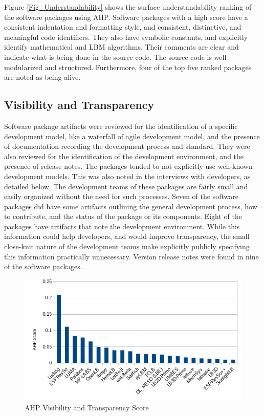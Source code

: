 \documentclass[12pt, notitlepage]{article}
\begin{document}
Figure \ref{Fig_Understandability} shows the surface understandability ranking of the software packages using AHP. Software packages with a high score have a consistent indentation and formatting style, and consistent, distinctive, and meaningful code identifiers. They also have symbolic constants, and explicitly identify mathematical and LBM algorithms. Their comments are clear and indicate what is being done in the source code. The source code is well modularized and structured. Furthermore, four of the top five ranked packages are noted as being alive.

\subsection{Visibility and Transparency}

Software package artifacts were reviewed for the identification of a specific development model, like a waterfall of agile development model, and the presence of documentation recording the development process and standard. They were also reviewed for the identification of the development environment, and the presence of release notes. The packages tended to not explicitly use well-known development models. This was also noted in the interviews with developers, as detailed below. The development teams of these packages are fairly small and easily organized without the need for such processes. Seven of the software packages did have some artifacts outlining the general development process, how to contribute, and the status of the package or its components. Eight of the packages have artifacts that note the development environment. While this information could help developers, and would improve transparency, the small close-knit nature of the development teams make explicitly publicly specifying this information practically unnecessary. Version release notes were found in nine of the software packages.

\begin{figure}[h!]
	\begin{center}
		\includegraphics[width=1.0\textwidth]{visibilitytransparency_chart}
		\caption{AHP Visibility and Transparency Score}
		\label{Fig_VisibilityTransparency}
	\end{center}
\end{figure}
\end{document}
